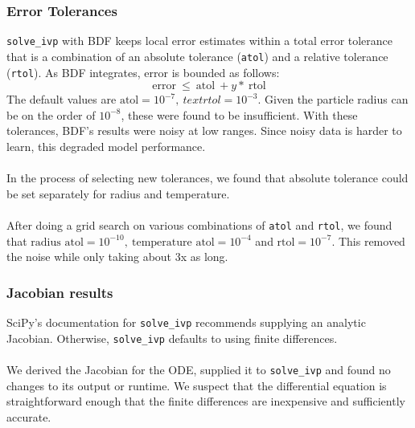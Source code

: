 \documentclass{article}
\begin{document}
\subsubsection{Error Tolerances}
\lstinline{solve_ivp} with BDF keeps local error estimates within a total error tolerance that is a combination of an absolute tolerance (\lstinline{atol}) and a relative tolerance (\lstinline{rtol}). As BDF integrates, error is bounded as follows:
\[
	\text{error} \ \leq \ \text{atol} \ + y * \ \text{rtol}
\]
The default values are $\text{atol}=10^{-7},\ text{rtol}=10^{-3}$. Given the particle radius can be on the order of $10^{-8}$, these were found to be insufficient. With these tolerances, BDF's results were noisy at low ranges. Since noisy data is harder to learn, this degraded model performance.\\\\
In the process of selecting new tolerances, we found that absolute tolerance could be set separately for radius and temperature.\\\\
After doing a grid search on various combinations of \lstinline{atol} and \lstinline{rtol}, we found that $\text{radius atol}=10^{-10}, \ \text{temperature atol}=10^{-4}$ and $\text{rtol}=10^{-7}$. This removed the noise while only taking about 3x as long.
\subsubsection{Jacobian results}
SciPy's documentation for \lstinline{solve_ivp} recommends supplying an analytic Jacobian. Otherwise, \lstinline{solve_ivp} defaults to using finite differences.\\\\
We derived the Jacobian for the ODE, supplied it to \lstinline{solve_ivp} and found no changes to its output or runtime. We suspect that the differential equation is straightforward enough that the finite differences are inexpensive and sufficiently accurate.
\end{document}
